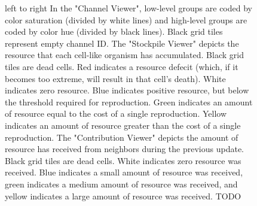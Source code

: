 \begin{figure}[!htbp]
\begin{center}
\caption{
left to right
In the "Channel Viewer", low-level groups are coded by color saturation (divided by white lines) and high-level groups are coded by color hue (divided by black lines).
Black grid tiles represent empty channel ID.
The "Stockpile Viewer" depicts the resource that each cell-like organism has accumulated. Black grid tiles are dead cells. Red indicates a resource defecit (which, if it becomes too extreme, will result in that cell's death). White indicates zero resource. Blue indicates positive resource, but below the threshold required for reproduction. Green indicates an amount of resource equal to the cost of a single reproduction. Yellow indicates an amount of resource greater than the cost of a single reproduction.
The "Contribution Viewer" depicts the amount of resource has received from neighbors during the previous update. Black grid tiles are dead cells. White indicates zero resource was received. Blue indicates a small amount of resource was received, green indicates a medium amount of resource was received, and yellow indicates a large amount of resource was received.
TODO
}
\label{fig:outcome_grids}
\end{center}
\end{figure}
